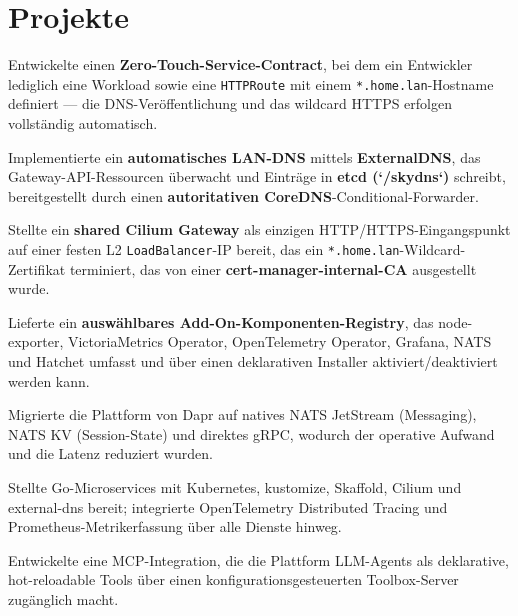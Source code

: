 \documentclass[10pt,a4paper]{resume}
\begin{document}
\vspace{2pt}

\section{Projekte}

\bullets
  \item Entwickelte einen \textbf{Zero-Touch-Service-Contract}, bei dem ein Entwickler lediglich eine Workload sowie eine \texttt{HTTPRoute} mit einem \texttt{*.home.lan}-Hostname definiert — die DNS-Veröffentlichung und das wildcard HTTPS erfolgen vollständig automatisch.
  \item Implementierte ein \textbf{automatisches LAN-DNS} mittels \textbf{ExternalDNS}, das Gateway-API-Ressourcen überwacht und Einträge in \textbf{etcd (`/skydns`)} schreibt, bereitgestellt durch einen \textbf{autoritativen CoreDNS}-Conditional-Forwarder.
  \item Stellte ein \textbf{shared Cilium Gateway} als einzigen HTTP/HTTPS-Eingangspunkt auf einer festen L2 \texttt{LoadBalancer}-IP bereit, das ein \texttt{*.home.lan}-Wildcard-Zertifikat terminiert, das von einer \textbf{cert-manager-internal-CA} ausgestellt wurde.
  \item Lieferte ein \textbf{auswählbares Add-On-Komponenten-Registry}, das node-exporter, VictoriaMetrics Operator, OpenTelemetry Operator, Grafana, NATS und Hatchet umfasst und über einen deklarativen Installer aktiviert/deaktiviert werden kann.
\bulletsend
\vspace{1.0pt}
\bullets
  \item Migrierte die Plattform von Dapr auf natives NATS JetStream (Messaging), NATS KV (Session-State) und direktes gRPC, wodurch der operative Aufwand und die Latenz reduziert wurden.
  \item Stellte Go-Microservices mit Kubernetes, kustomize, Skaffold, Cilium und external-dns bereit; integrierte OpenTelemetry Distributed Tracing und Prometheus-Metrikerfassung über alle Dienste hinweg.
  \item Entwickelte eine MCP-Integration, die die Plattform LLM-Agents als deklarative, hot-reloadable Tools über einen konfigurationsgesteuerten Toolbox-Server zugänglich macht.
\bulletsend
\end{document}
